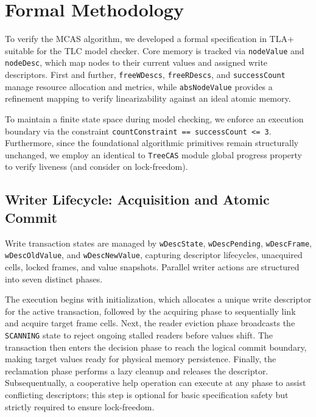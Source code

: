 \section{Formal Methodology}
\label{sec:formal_methodology}

To verify the MCAS algorithm, we developed a formal specification in TLA+ suitable for the TLC model checker. Core memory is tracked via \texttt{nodeValue} and \texttt{nodeDesc}, which map nodes to their current values and assigned write descriptors. First and further, \texttt{freeWDescs}, \texttt{freeRDescs}, and \texttt{successCount} manage resource allocation and metrics, while \texttt{absNodeValue} provides a refinement mapping to verify linearizability against an ideal atomic memory.

To maintain a finite state space during model checking, we enforce an execution boundary via the constraint \texttt{countConstraint == successCount <= 3}. Furthermore, since the foundational algorithmic primitives remain structurally unchanged, we employ an identical to \texttt{TreeCAS} module global progress property to verify liveness (and consider on lock-freedom).

\subsection{Writer Lifecycle: Acquisition and Atomic Commit}

Write transaction states are managed by \texttt{wDescState}, \texttt{wDescPending}, \texttt{wDescFrame}, \texttt{wDescOldValue}, and \texttt{wDescNewValue}, capturing descriptor lifecycles, unacquired cells, locked frames, and value snapshots. Parallel writer actions are structured into seven distinct phases.

The execution begins with initialization, which allocates a unique write descriptor for the active transaction, followed by the acquiring phase to sequentially link and acquire target frame cells. Next, the reader eviction phase broadcasts the \texttt{SCANNING} state to reject ongoing stalled readers before values shift. The transaction then enters the decision phase to reach the logical commit boundary, making target values ready for physical memory persistence. Finally, the reclamation phase performs a lazy cleanup and releases the descriptor. Subsequentually, a cooperative help operation can execute at any phase to assist conflicting descriptors; this step is optional for basic specification safety but strictly required to ensure lock-freedom.


